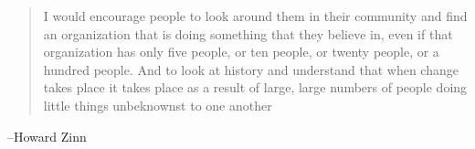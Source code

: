 \documentclass[letterpaper, landscape]{exam}
\begin{document}
  \else
    \vspace{10 cm}
    \begin{quote}
      \begin{em}
        I would encourage people to look around them in their community and find an
        organization that is doing something that they believe in, even if that
        organization has only five people, or ten people, or twenty people, or a hundred
        people. And to look at history and understand that when change takes place it
        takes place as a result of large, large numbers of people doing little things
        unbeknownst to one another
      \end{em}
    \end{quote}
    \hspace{1 cm} --Howard Zinn
  \fi
\end{document}
